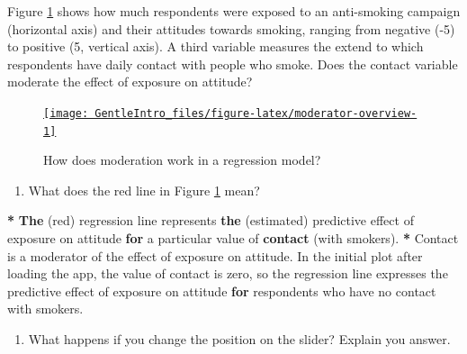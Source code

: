 \documentclass[a4paper]{book}
\newenvironment{Shaded}{\begin{snugshade}}{\end{snugshade}}
\newcommand{\KeywordTok}[1]{\textcolor[rgb]{0,0,0}{\textbf{#1}}}
\newcommand{\StringTok}[1]{\textcolor[rgb]{0.00,0.00,0.00}{#1}}
\newcommand{\ControlFlowTok}[1]{\textcolor[rgb]{0.00,0.00,0.00}{\textbf{#1}}}
\newcommand{\OperatorTok}[1]{\textcolor[rgb]{0.00,0.00,0.00}{\textbf{#1}}}
\newcommand{\NormalTok}[1]{#1}
\providecommand{\tightlist}{%
  \setlength{\itemsep}{0pt}\setlength{\parskip}{0pt}}
\theoremstyle{definition}
\theoremstyle{definition}
\theoremstyle{definition}
\theoremstyle{remark}
\begin{document}
Figure \ref{fig:moderator-overview} shows how much respondents were
exposed to an anti-smoking campaign (horizontal axis) and their
attitudes towards smoking, ranging from negative (-5) to positive (5,
vertical axis). A third variable measures the extend to which
respondents have daily contact with people who smoke. Does the contact
variable moderate the effect of exposure on attitude?

\begin{figure}[H]
\href{http://82.196.4.233:3838/apps/continuous-moderator/}{\texttt{[image: GentleIntro\_files/figure-latex/moderator-overview-1]} }\caption{How does moderation work in a regression model?}\label{fig:moderator-overview}
\end{figure}

\begin{enumerate}
\def\labelenumi{\arabic{enumi}.}
\tightlist
\item
  What does the red line in Figure \ref{fig:moderator-overview} mean?
\end{enumerate}

\begin{Shaded}
\begin{Highlighting}[]
\OperatorTok{*}\StringTok{ }\KeywordTok{The}\NormalTok{ (red) regression line represents }\KeywordTok{the}\NormalTok{ (estimated) predictive effect of}
\NormalTok{exposure on attitude }\ControlFlowTok{for}\NormalTok{ a particular value of }\KeywordTok{contact}\NormalTok{ (with smokers).}
\OperatorTok{*}\StringTok{ }\NormalTok{Contact is a moderator of the effect of exposure on attitude. In the initial}
\NormalTok{plot after loading the app, the value of contact is zero, so the regression}
\NormalTok{line expresses the predictive effect of exposure on attitude }\ControlFlowTok{for}\NormalTok{ respondents}
\NormalTok{who have no contact with smokers.}
\end{Highlighting}
\end{Shaded}

\begin{enumerate}
\def\labelenumi{\arabic{enumi}.}
\setcounter{enumi}{1}
\tightlist
\item
  What happens if you change the position on the slider? Explain you
  answer.
\end{enumerate}
\end{document}
